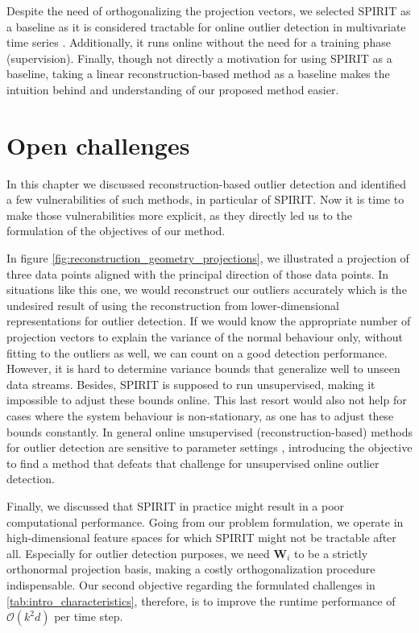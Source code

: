 Despite the need of orthogonalizing the projection vectors, we selected SPIRIT as a baseline as it is considered tractable for online outlier detection in multivariate time series \cite{aggarwal2015outlier}. Additionally, it runs online without the need for a training phase (supervision). Finally, though not directly a motivation for using SPIRIT as a baseline, taking a linear reconstruction-based method as a baseline makes the intuition behind and understanding of our proposed method easier.

\vspace{-0.1cm}
\section{Open challenges}
\label{sec:reconstruction_challenges}
In this chapter we discussed reconstruction-based outlier detection and identified a few vulnerabilities of such methods, in particular of SPIRIT. Now it is time to make those vulnerabilities more explicit, as they directly led us to the formulation of the objectives of our method.

In figure \ref{fig:reconstruction_geometry_projections}, we illustrated a projection of three data points aligned with the principal direction of those data points. In situations like this one, we would reconstruct our outliers accurately which is the undesired result of using the reconstruction from lower-dimensional representations for outlier detection. 
If we would know the appropriate number of projection vectors to explain the variance of the normal behaviour only, without fitting to the outliers as well, we can count on a good detection performance. However, it is hard to determine variance bounds that generalize well to unseen data streams. Besides, SPIRIT is supposed to run unsupervised, making it impossible to adjust these bounds online. This last resort would also not help for cases where the system behaviour is non-stationary, as one has to adjust these bounds constantly. In general online unsupervised (reconstruction-based) methods for outlier detection are sensitive to parameter settings \cite{aggarwal2015outlier}, introducing the objective to find a method that defeats that challenge for unsupervised online outlier detection. 

Finally, we discussed that SPIRIT in practice might result in a poor computational performance. Going from our problem formulation, we operate in high-dimensional feature spaces for which SPIRIT might not be tractable after all. Especially for outlier detection purposes, we need $\mathbf{W}_i$ to be a strictly orthonormal projection basis, making a costly orthogonalization procedure indispensable. Our second objective regarding the formulated challenges in \ref{tab:intro_characteristics}, therefore, is to improve the runtime performance of $\mathcal{O}(k^2d)$ per time step.


